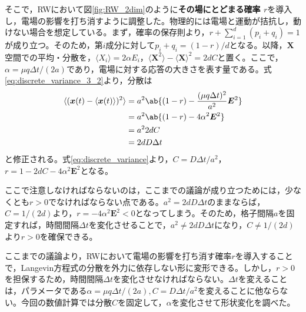 \documentclass[autodetect-engine,dvi=dvipdfmx,a4paper,ja=standard,oneside,openany,11pt]{bxjsbook}
\begin{document}
そこで，RWにおいて図\ref{fig:RW_2dim}のように\textbf{その場にとどまる確率 $r$}を導入し，電場の影響を打ち消すように調整した。物理的には電場と運動が拮抗し，動けない場合を想定している。まず，確率の保存則より，$r+\sum_{i=1}^{d}(p_i+q_i) =1$が成り立つ。そのため，第$i$成分に対して$p_i+q_i=(1-r)/d$となる。以降，$\bm{X}$空間での平均・分散を，$\langle X_i\rangle=2\alpha E_i$，$\langle\bm{X}^2\rangle-\langle\bm{X}\rangle^2=2dC$と置く。ここで，$\alpha=\mu q\Delta t/(2a)$であり，電場に対する応答の大きさを表す量である。式\eqref{eq:discrete_variance_3_2}より，分散は
\begin{equation}
  \begin{split}
    \langle(\bm{x}(t)-\langle\bm{x}(t)\rangle)^2\rangle & =a^2\ab\{(1-r)-\frac{(\mu q \Delta t)^2}{a^2}\bm{E}^2\} \\
                                                        & =a^2\ab\{(1-r)-4\alpha^2\bm{E}^2\}                      \\
                                                        & =a^2 2dC                                                \\
                                                        & =2dD\Delta t
  \end{split}
  \label{eq:discrete_variance}
\end{equation}
と修正される。式\eqref{eq:discrete_variance}より，$C=D\Delta t/a^2$，$r=1-2dC-4\alpha^2\bm{E}^2$となる。

ここで注意しなければならないのは，ここまでの議論が成り立つためには，少なくとも$r>0$でなければならない点である。$a^2=2dD\Delta t$のままならば，$C=1/(2d)$より，$r=-4\alpha^2\bm{E}^2<0$となってしまう。そのため，格子間隔$a$を固定すれば，時間間隔$\Delta t$を変化させることで，$a^2\neq2dD\Delta t$になり，$C\neq1/(2d)$より$r>0$を確保できる。

ここまでの議論より，RWにおいて電場の影響を打ち消す確率$r$を導入することで，Langevin方程式の分散を外力に依存しない形に変形できる。しかし，$r>0$を担保するため，時間間隔$\Delta t$を変化させなければならない。$\Delta t$を変えることは，パラメータである$\alpha=\mu q\Delta t/(2a),C=D\Delta t/a^2$を変えることに他ならない。今回の数値計算では分散$C$を固定して，$\alpha$を変化させて形状変化を調べた。
\end{document}
